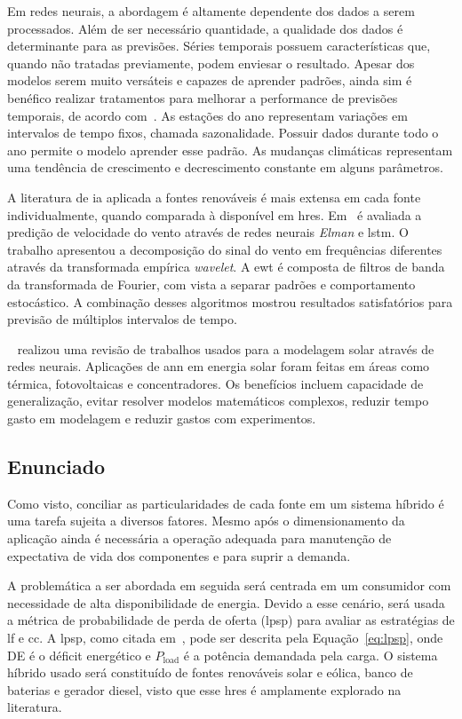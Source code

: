 Em redes neurais, a abordagem é altamente dependente dos dados a serem
processados. Além de ser necessário quantidade, a qualidade dos dados é
determinante para as previsões. Séries temporais possuem características que,
quando não tratadas previamente, podem enviesar o resultado.  Apesar dos modelos
serem muito versáteis e capazes de aprender padrões, ainda sim é benéfico
realizar tratamentos para melhorar a performance de previsões temporais, de acordo
com~\cite{Zhang_2005}.  As estações do ano representam variações em intervalos
de tempo fixos, chamada sazonalidade. Possuir dados durante todo o ano permite o
modelo aprender esse padrão. As mudanças climáticas representam uma tendência de
crescimento e decrescimento constante em alguns parâmetros.

A literatura de \acrshort{ia} aplicada a fontes renováveis é mais extensa em
cada fonte individualmente, quando comparada à disponível em \acrshort{hres}.
Em~\cite{Liu_2018} é avaliada a predição de velocidade do vento através de redes
neurais \emph{Elman} e \acrshort{lstm}. O trabalho apresentou a decomposição do
sinal do vento em frequências diferentes através da transformada empírica
\emph{wavelet}. A \acrshort{ewt} é composta de filtros de banda da transformada
de Fourier, com vista a separar padrões e comportamento estocástico. A
combinação desses algoritmos mostrou resultados satisfatórios para previsão de
múltiplos intervalos de tempo.

~\cite{elsheikh2019modeling} realizou uma revisão de trabalhos usados para a
modelagem solar através de redes neurais. Aplicações de \acrshort{ann} em
energia solar foram feitas em áreas como térmica, fotovoltaicas e
concentradores. Os benefícios incluem capacidade de generalização, evitar
resolver modelos matemáticos complexos, reduzir tempo gasto em modelagem e
reduzir gastos com experimentos.

\subsection{Enunciado}

Como visto, conciliar as particularidades de cada fonte em um sistema híbrido é
uma tarefa sujeita a diversos fatores. Mesmo após o dimensionamento da aplicação
ainda é necessária a operação adequada para manutenção de expectativa de vida
dos componentes e para suprir a demanda.

A problemática a ser abordada em seguida será centrada em um consumidor com
necessidade de alta disponibilidade de energia. Devido a esse cenário, será
usada a métrica de probabilidade de perda de oferta (\acrshort{lpsp}) para avaliar as estratégias de \acrlong{lf} e
\acrlong{cc}.  A \acrlong{lpsp}, como citada em~\cite{Upadhyay_2014}, pode ser
descrita pela Equação~\ref{eq:lpsp}, onde DE é o déficit energético e
$P_{\text{load}}$ é a potência demandada pela carga.
O sistema híbrido usado
será constituído de fontes renováveis solar e eólica, banco de baterias e
gerador diesel, visto que esse \acrshort{hres} é amplamente explorado na
literatura.

